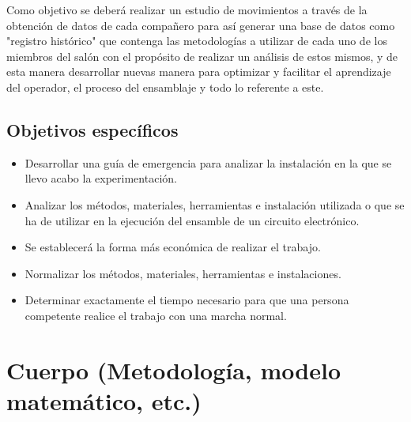         Como objetivo se deberá realizar un estudio de movimientos a través de la obtención de datos de cada compañero para así generar una base de datos como "registro histórico" que contenga las metodologías a utilizar de cada uno de los miembros del salón con el propósito de realizar un análisis de estos mismos, y de esta manera desarrollar nuevas manera para optimizar y facilitar el aprendizaje del operador, el proceso del ensamblaje y todo lo referente a este.
    
    \subsection{Objetivos específicos }
    
    \begin{itemize}
    \item Desarrollar una guía de emergencia para analizar la instalación en la que se llevo acabo la experimentación.
    \item Analizar los métodos, materiales, herramientas e instalación utilizada o que se ha de utilizar en la ejecución del ensamble de un circuito electrónico.
    \item Se establecerá la forma más económica de realizar el trabajo.
    \item Normalizar los métodos, materiales, herramientas e instalaciones.
    \item Determinar exactamente el tiempo necesario para que una persona competente realice el trabajo con una marcha normal.
    \end{itemize}
    
    \section{Cuerpo (Metodología, modelo matemático, etc.)}
    
    
